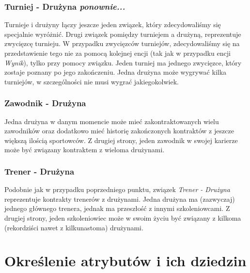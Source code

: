 \documentclass{mwrep}[15pt]
\begin{document}
\subsubsection{Turniej - Drużyna \emph{ponownie...}}
Turnieje i drużyny łączy jeszcze jeden związek, który zdecydowaliśmy się specjalnie wyróżnić. Drugi związek pomiędzy turniejem a drużyną, reprezentuje zwycięzcę turnieju. W przypadku zwycięzców turniejów, 
zdecydowaliśmy się na przedstawienie tego nie za pomocą kolejnej encji (tak jak w przypadku encji \emph{Wynik}), tylko 
przy pomocy związku. Jeden turniej ma jednego zwycięzce, który zostaje poznany po jego zakończeniu. Jedna drużyna może wygrywać kilka turniejów,
w szczególności nie musi wygrać jakiegokolwiek.


\subsubsection{Zawodnik - Drużyna}
Jedna drużyna w danym momencie może mieć zakontraktowanych wielu zawodników oraz dodatkowo mieć historię zakończonych kontraktów z 
jeszcze większą ilością sportowców. Z drugiej strony, jeden zawodnik w swojej karierze może być związany
kontraktem z wieloma drużynami. 


\subsubsection{Trener - Drużyna}
Podobnie jak w przypadku poprzedniego punktu, związek \emph{Trener - Drużyna} reprezentuje kontrakty trenerów z drużynami.
Jedna drużyna ma (zazwyczaj) jednego głównego trenera, jednak ma przeszłość z innymi szkoleniowcami. Z drugiej strony, jeden szkoleniowiec
może w swoim życiu być związany z kilkoma (rekordziści nawet z kilkunastoma) drużynami. 

\newpage

\section{Określenie atrybutów i ich dziedzin}
\vspace{1.5cm}
\end{document}
